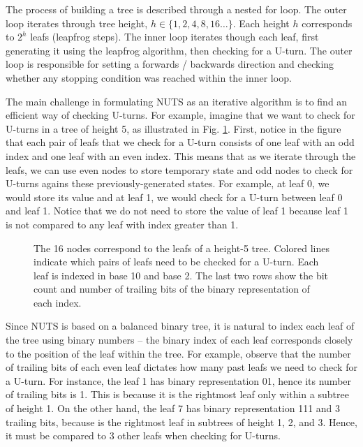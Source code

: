 \documentclass[12pt]{article}
\begin{document}
{The process of building a tree is described through a nested for loop. The outer loop iterates through tree height, $h \in \{1, 2, 4, 8, 16 \ldots \}$. Each height $h$ corresponds to $2^h$ leafs (leapfrog steps). The inner loop iterates though each leaf, first generating it using the leapfrog algorithm, then checking for a U-turn. The outer loop is responsible for setting a forwards / backwards direction and checking whether any stopping condition was reached within the inner loop.

The main challenge in formulating NUTS as an iterative algorithm is to find an efficient way of checking U-turns. For example, imagine that we want to check for U-turns in a tree of height 5, as illustrated in Fig. \ref{fig_iterative_nuts_indexing}. First, notice in the figure that each pair of leafs that we check for a U-turn consists of one leaf with an odd index and one leaf with an even index. This means that as we iterate through the leafs, we can use even nodes to store temporary state and odd nodes to check for U-turns agains these previously-generated states. For example, at leaf 0, we would store its value and at leaf 1, we would check for a U-turn between leaf 0 and leaf 1. Notice that we do not need to store the value of leaf 1 because leaf 1 is not compared to any leaf with index greater than 1.

\begin{figure}[H]
\centering
{}
\caption{The 16 nodes correspond to the leafs of a height-5 tree. Colored lines indicate which pairs of leafs need to be checked for a U-turn. Each leaf is indexed in base 10 and base 2. The last two rows show the bit count and number of trailing bits of the binary representation of each index.}
\label{fig_iterative_nuts_indexing}
\end{figure}

Since NUTS is based on a balanced binary tree, it is natural to index each leaf of the tree using binary numbers -- the binary index of each leaf corresponds closely to the position of the leaf within the tree. For example, observe that the number of trailing bits of each even leaf dictates how many past leafs we need to check for a U-turn. For instance, the leaf 1 has binary representation 01, hence its number of trailing bits is 1. This is because it is the rightmost leaf only within a subtree of height 1. On the other hand, the leaf 7 has binary representation 111 and 3 trailing bits, because is the rightmost leaf in subtrees of height 1, 2, and 3. Hence, it must be compared to 3 other leafs when checking for U-turns.

}
\end{document}
